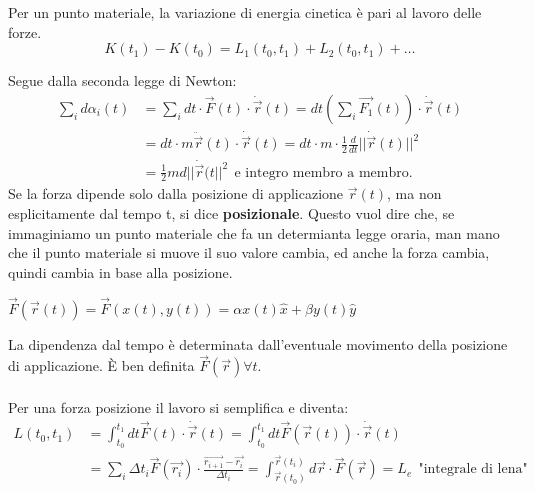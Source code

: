 \begin{theorem}
    Per un punto materiale, la variazione di energia cinetica è pari al lavoro delle forze.
    $$K(t_1) - K(t_0) = L_1(t_0, t_1) + L_2(t_0, t_1) + \dots$$
\end{theorem}
\hspace{-15pt}Segue dalla seconda legge di Newton:
\begin{equation*}
    \begin{split}
        \sum_{i} d\alpha_i(t) & = \sum_i dt \cdot \vec{F}(t) \cdot \dot{\vec{r}}(t) = dt (\sum_i \vec{F_1}(t)) \cdot \dot{\vec{r}}(t)\\
                              & = dt \cdot m \ddot{\vec{r}}(t) \cdot \dot{\vec{r}}(t) = dt \cdot m \cdot \frac{1}{2}\frac{d}{dt}||\dot{\vec{r}}(t)||^2\\
                              & = \frac{1}{2}md||\dot{\vec{r}}(t||^2 \:\: \text{e integro membro a membro.}
    \end{split}
\end{equation*}
Se la forza dipende solo dalla posizione di applicazione $\vec{r}(t)$, ma non esplicitamente dal tempo t, si dice \textbf{posizionale}. Questo vuol
dire che, se immaginiamo un punto materiale che fa un determianta legge oraria, man mano che il punto materiale si muove il suo valore cambia, ed anche la forza 
cambia, quindi cambia in base alla posizione.
\begin{example}
    $\vec{F}(\vec{r}(t)) = \vec{F}(x(t), y(t)) = \alpha x(t) \hat{x} + \beta y(t) \hat{y}$
\end{example}
\hspace{-15pt}La dipendenza dal tempo è determinata dall'eventuale movimento della posizione di applicazione. È ben definita $\vec{F}(\vec{r}) \forall t$. \\\\
Per una forza posizione il lavoro si semplifica e diventa:
\begin{equation*}
    \begin{split}
        L(t_0, t_1) & = \int_{t_0}^{t_1}dt \vec{F}(t) \cdot \dot{\vec{r}}(t) = \int_{t_0}^{t_1}dt \vec{F}(\vec{r}(t)) \cdot \dot{\vec{r}}(t) \\
                    & = \sum_i \Delta t_i \vec{F}(\vec{r_i}) \cdot \frac{\vec{r_{i+1}} - \vec{r_i}}{\Delta t_i} = \int_{\vec{r}(t_0 )}^{\vec{r}(t_i)} d\vec{r}\cdot \vec{F}(\vec{r}) = L_e \:\:\text{"integrale di lena"}
    \end{split}
\end{equation*}
